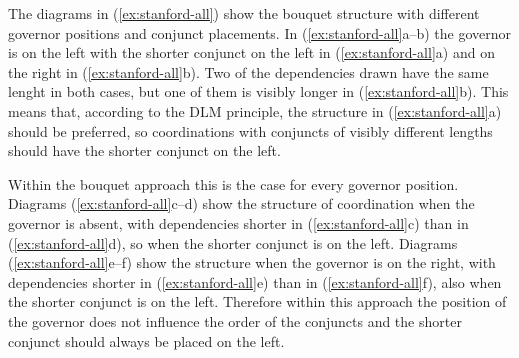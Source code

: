 \vspace{0.5\treeheight}

The diagrams in (\ref{ex:stanford-all}) show the bouquet structure with different governor positions and conjunct placements. In (\ref{ex:stanford-all}a--b) the governor is on the left with the shorter conjunct on the left in (\ref{ex:stanford-all}a) and on the right in (\ref{ex:stanford-all}b). Two of the dependencies drawn have the same lenght in both cases, but one of them is visibly longer in (\ref{ex:stanford-all}b). This means that, according to the DLM principle, the structure in (\ref{ex:stanford-all}a) should be preferred, so coordinations with conjuncts of visibly different lengths should have the shorter conjunct on the left. 

Within the bouquet approach this is the case for every governor position. Diagrams (\ref{ex:stanford-all}c--d) show the structure of coordination when the governor is absent, with dependencies shorter in (\ref{ex:stanford-all}c) than in (\ref{ex:stanford-all}d), so when the shorter conjunct is on the left. Diagrams (\ref{ex:stanford-all}e--f) show the structure when the governor is on the right, with dependencies shorter in (\ref{ex:stanford-all}e) than in (\ref{ex:stanford-all}f), also when the shorter conjunct is on the left. Therefore within this approach the position of the governor does not influence the order of the conjuncts and the shorter conjunct should always be placed on the left. 

